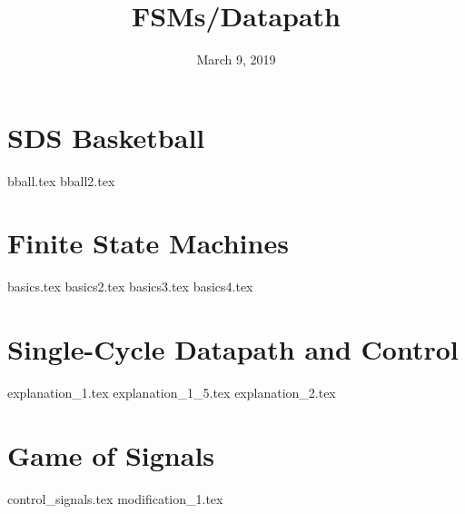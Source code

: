 \documentclass[11pt]{exam}
\title{FSMs/Datapath}
\date{March 9, 2019}
\begin{document}
\maketitle

\section{SDS Basketball}
\begin{questions}
{bball.tex}
{bball2.tex}
\end{questions}
\newpage

\section{Finite State Machines}
\begin{questions}
{basics.tex}
{basics2.tex}
{basics3.tex}
{basics4.tex}
\end{questions}
\newpage

\section{Single-Cycle Datapath and Control}
\begin{questions}
{explanation_1.tex}
{explanation_1_5.tex}
{explanation_2.tex}
\end{questions}
\newpage

\section{Game of Signals}
\begin{questions}
{control_signals.tex}
{modification_1.tex}
\end{questions}
\newpage
\end{document}
